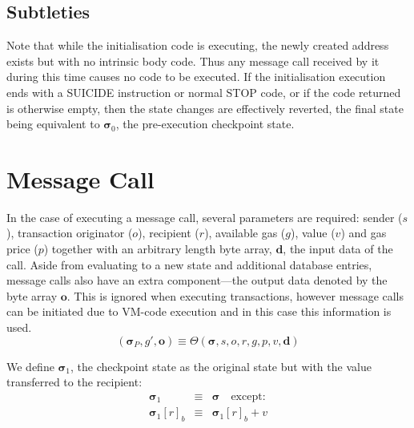 \documentclass[9pt,oneside]{amsart}
\begin{document}
\begin{multicols}{2}
\subsection{Subtleties}
Note that while the initialisation code is executing, the newly created address exists but with no intrinsic body code. Thus any message call received by it during this time causes no code to be executed. If the initialisation execution ends with a {\small SUICIDE} instruction or normal {\small STOP} code, or if the code returned is otherwise empty, then the state changes are effectively reverted, the final state being equivalent to $\boldsymbol{\sigma}_0$, the pre-execution checkpoint state.

\section{Message Call} \label{ch:call}

In the case of executing a message call, several parameters are required: sender ($s$), transaction originator ($o$), recipient ($r$), available gas ($g$), value ($v$) and gas price ($p$) together with an arbitrary length byte array, $\mathbf{d}$, the input data of the call. Aside from evaluating to a new state and additional database entries, message calls also have an extra component---the output data denoted by the byte array $\mathbf{o}$. This is ignored when executing transactions, however message calls can be initiated due to VM-code execution and in this case this information is used.
\begin{equation}
(\boldsymbol{\sigma}_P, g', \mathbf{o}) \equiv \Theta(\boldsymbol{\sigma}, s, o, r, g, p, v, \mathbf{d})
\end{equation}

We define $\boldsymbol{\sigma}_1$, the checkpoint state as the original state but with the value transferred to the recipient:
\begin{eqnarray}
\boldsymbol{\sigma}_1 & \equiv & \boldsymbol{\sigma} \quad \text{except:} \\
\boldsymbol{\sigma}_1[r]_b & \equiv & \boldsymbol{\sigma}_1[r]_b + v
\end{eqnarray}


\end{multicols}
\end{document}
